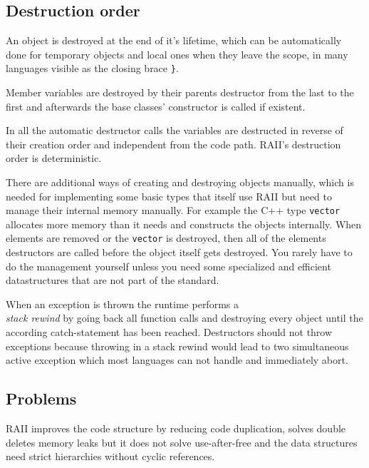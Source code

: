 \documentclass[conference,twocolumn]{IEEEtran}
\begin{document}
\subsection{Destruction order}


An object is destroyed at the end of it's lifetime, which can be automatically done for temporary objects and local ones when they leave the scope, in many languages visible as the closing brace \verb|}|.

Member variables are destroyed by their parents destructor from the last to the first and afterwards the base classes' constructor is called if existent.

In all the automatic destructor calls the variables are destructed in reverse of their creation order and independent from the code path. RAII's destruction order is deterministic.

There are additional ways of creating and destroying objects manually, which is needed for implementing some basic types that itself use RAII but need to manage their internal memory manually. For example the C++ type \verb|vector| allocates more memory than it needs and constructs the objects internally. When elements are removed or the \verb|vector| is destroyed, then all of the elements destructors are called before the object itself gets destroyed. You rarely have to do the management yourself unless you need some specialized and efficient datastructures that are not part of the standard.










When an exception is thrown the runtime performs a \\ \emph{stack rewind} by going back all function calls and destroying every object until the according catch-statement has been reached. Destructors should not throw exceptions because throwing in a stack rewind would lead to two simultaneous active exception which most languages can not handle and immediately abort.






\subsection{Problems}
RAII improves the code structure by reducing code duplication, solves double deletes memory leaks but it does not solve use-after-free and the data structures need strict hierarchies without cyclic references.
\end{document}
